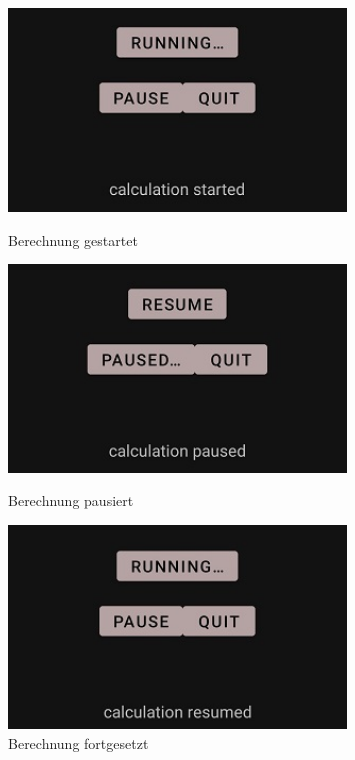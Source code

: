 \documentclass[12pt, onecolumn, notitlepage]{scrartcl}
\begin{document}
\begin{figure}[H] 
	\begin{minipage}[b]{.4\linewidth}
		\centering
		\includegraphics[width=0.8\textwidth]{calc_running.jpg}
		\caption{Berechnung gestartet}
	\end{minipage}
	\hspace{.1\linewidth}
	\begin{minipage}[b]{.4\linewidth}
		\centering
		\includegraphics[width=0.8\textwidth]{calc_paused.jpg}
		\caption{Berechnung pausiert}
	\end{minipage}
	\hspace{.1\linewidth}
	\centering
	\begin{minipage}[b]{.4\linewidth}
		\centering
		\includegraphics[width=0.8\textwidth]{calc_resumed.jpg}
		\caption{Berechnung fortgesetzt}
	\end{minipage}
\end{figure}
\end{document}
